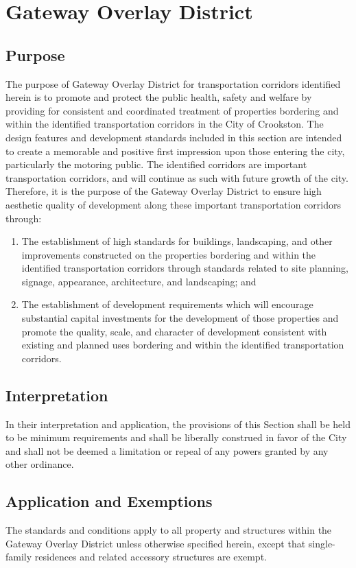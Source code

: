 \setcounter{section}{84}
\section{Gateway Overlay District}
\subsection{Purpose}
The purpose of Gateway Overlay District for transportation corridors identified herein is to promote and protect the public health, safety and welfare by providing for consistent and coordinated treatment of properties bordering and within the identified transportation corridors in the City of Crookston. The design features and development standards included in this section are intended to create a memorable and positive first impression upon those entering the city, particularly the motoring public. The identified corridors are important transportation corridors, and will continue as such with future growth of the city. Therefore, it is the purpose of the Gateway Overlay District to ensure high aesthetic quality of development along these important transportation corridors through:
\begin{enumerate}[{\indent}1)]
    \item The establishment of high standards for buildings, landscaping, and other improvements constructed on the properties bordering and within the identified transportation corridors through standards related to site planning, signage, appearance, architecture, and landscaping; and
    \item The establishment of development requirements which will encourage substantial capital investments for the development of those properties and promote the quality, scale, and character of development consistent with existing and planned uses bordering and within the identified transportation corridors.
\end{enumerate}
\subsection{Interpretation}
In their interpretation and application, the provisions of this Section shall be held to be minimum requirements and shall be liberally construed in favor of the City and shall not be deemed a limitation or repeal of any powers granted by any other ordinance.
\subsection{Application and Exemptions}
The standards and conditions apply to all property and structures within the Gateway Overlay District unless otherwise specified herein, except that single-family residences and related accessory structures are exempt.
